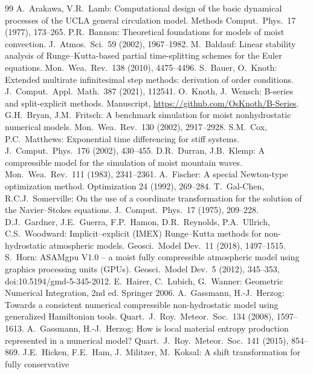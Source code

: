\documentclass[11pt,a4paper]{article}
\begin{document}
\begin{thebibliography}{99}
 A.~Arakawa, V.R.~Lamb: Computational design of the basic dynamical processes of the UCLA
general circulation model. Methods Comput.\ Phys.\ 17 (1977), 173--265.
 P.R.~Bannon: Theoretical foundations for models of moist convection. J.\ Atmos.\ Sci.\ 59 (2002),
1967--1982.
 M.~Baldauf: Linear stability analysis of Runge--Kutta-based partial time-splitting
schemes for the Euler equations. Mon.\ Wea.\ Rev.\ 138 (2010), 4475--4496.
 S.~Bauer, O.~Knoth: Extended multirate infinitesimal step methods: derivation of order
conditions. J.\ Comput.\ Appl.\ Math.\ 387 (2021), 112541.
 O.~Knoth, J.~Wensch: B-series and split-explicit methods. Manuscript,
\url{https://github.com/OsKnoth/B-Series}.
 G.H.~Bryan, J.M.~Fritsch: A benchmark simulation for moist nonhydrostatic numerical
models. Mon.\ Wea.\ Rev.\ 130 (2002), 2917--2928.
 S.M.~Cox, P.C.~Matthews: Exponential time differencing for stiff systems.
J.\ Comput.\ Phys.\ 176 (2002), 430--455.
 D.R.~Durran, J.B.~Klemp: A compressible model for the simulation of moist mountain
waves. Mon.\ Wea.\ Rev.\ 111 (1983), 2341--2361.
 A.~Fischer: A special Newton-type optimization method. Optimization 24 (1992), 269--284.
 T.~Gal-Chen, R.C.J.~Somerville: On the use of a coordinate transformation for the
solution of the Navier--Stokes equations. J.\ Comput.\ Phys.\ 17 (1975), 209--228.
 D.J.~Gardner, J.E.~Guerra, F.P.~Hamon, D.R.~Reynolds, P.A.~Ullrich, C.S.~Woodward:
Implicit--explicit (IMEX) Runge--Kutta methods for non-hydrostatic atmospheric models. Geosci.\ Model
Dev.\ 11 (2018), 1497--1515.
 S.~Horn: ASAMgpu V1.0 -- a moist fully compressible atmospheric model using graphics processing
units (GPUs). Geosci.\ Model Dev.\ 5 (2012), 345--353, doi:10.5194/gmd-5-345-2012.
 E.~Hairer, C.~Lubich, G.~Wanner: Geometric Numerical Integration, 2nd ed. Springer 2006.
 A.~Gassmann, H.-J.~Herzog: Towards a consistent numerical compressible non-hydrostatic model
using generalized Hamiltonian tools. Quart.\ J.\ Roy.\ Meteor.\ Soc.\ 134 (2008), 1597--1613.
 A.~Gassmann, H.-J.~Herzog: How is local material entropy production represented in a numerical
model? Quart.\ J.\ Roy.\ Meteor.\ Soc.\ 141 (2015), 854--869.
 J.E.~Hicken, F.E.~Ham, J.~Militzer, M.~Koksal: A shift transformation for fully conservative

\end{thebibliography}
\end{document}

